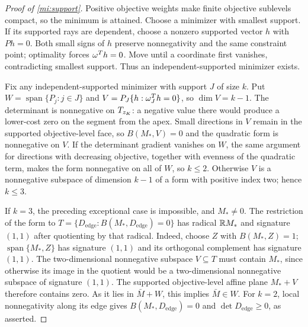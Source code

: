 \begin{proof}[Proof of \cref{mi:support}]\label{mi:support-proof}
Positive objective weights make finite objective sublevels compact, so
the minimum is attained. Choose a minimizer with smallest support.
If its supported rays are dependent, choose a nonzero supported vector
$h$ with $Ph=0$. Both small signs of $h$ preserve nonnegativity and the
same constraint point; optimality forces $\omega^Th=0$. Move until a
coordinate first vanishes, contradicting smallest support. Thus an
independent-supported minimizer exists.

Fix any independent-supported minimizer with support $J$ of size $k$.
Put $W=\operatorname{span}\{P_j:j\in J\}$ and
$V=P_J\{h:\omega_J^Th=0\}$, so $\dim V=k-1$.
The determinant is nonnegative on $T_{z_K}$: a negative value there
would produce a lower-cost zero on the segment from the apex.
Small directions in $V$ remain in the supported objective-level face,
so $B(M_*,V)=0$ and the quadratic form is nonnegative on $V$.
If the determinant gradient vanishes on $W$, the same argument for
directions with decreasing objective, together with evenness of the
quadratic term, makes the form nonnegative on all of $W$, so $k\le2$.
Otherwise $V$ is a nonnegative subspace of dimension $k-1$ of a form
with positive index two; hence $k\le3$.

If $k=3$, the preceding exceptional case is impossible, and $M_*\ne0$.
The restriction of the form to
$T=\{D_{\mathrm{edge}}:B(M_*,D_{\mathrm{edge}})=0\}$ has radical $\mathbb R M_*$ and signature $(1,1)$ after
quotienting by that radical. Indeed, choose $Z$ with $B(M_*,Z)=1$;
$\operatorname{span}\{M_*,Z\}$ has signature $(1,1)$ and its orthogonal
complement has signature $(1,1)$.
The two-dimensional nonnegative subspace $V\subseteq T$ must contain
$M_*$, since otherwise its image in the quotient would be a
two-dimensional nonnegative subspace of signature $(1,1)$.
The supported objective-level affine plane $M_*+V$ therefore contains
zero. As it lies in $\bar M+W$, this implies $\bar M\in W$.
For $k=2$, local nonnegativity along its edge gives
$B(M_*,D_{\mathrm{edge}})=0$ and $\det D_{\mathrm{edge}}\ge0$, as asserted.
\end{proof}

